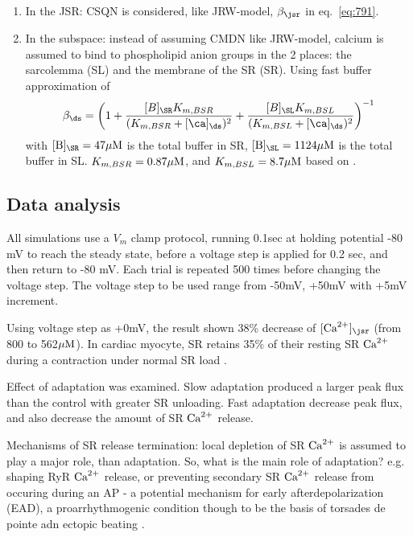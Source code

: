\begin{enumerate}
\item In the JSR: CSQN is considered, like JRW-model, $\beta_\jsr$ in
  eq.~\eqref{eq:791}.

\item In the subspace: instead of assuming CMDN like JRW-model,
  calcium is assumed to bind to phospholipid anion groups in the 2 places: the
  sarcolemma (SL) and the membrane of the SR (SR). Using fast buffer approximation of \citep{wagner1994erb}
  \begin{equation}
    \label{eq:1266}
    \beta_\ds = \left( 1 +
      \frac{[B]_\SR K_{m,BSR}}{(K_{m,BSR}+[\ca]_\ds)^2} 
      + \frac{[B]_\SL K_{m,BSL}}{(K_{m,BSL}+[\ca]_\ds)^2}\right)^{-1}
  \end{equation}
with $[\B]_\SR=47\muM$ is the total buffer in SR, $[\B]_\SL=1124\muM$
is the total buffer in SL. $K_{m,BSR}=0.87{\mu\text{M}}$, and
$K_{m,BSL}=8.7{\mu\text{M}}$ based on \citep{smith1998}. 
\end{enumerate}

\subsection{Data analysis}

All simulations use a $V_m$ clamp protocol, running 0.1sec at holding potential
-80 mV to reach the steady state, before a voltage step is applied for 0.2 sec,
and then return to -80 mV. Each trial is repeated 500 times before changing the
voltage step. The voltage step to be used range from -50mV, +50mV with +5mV
increment. 

Using voltage step as +0mV, the result shown 38\% decrease of $[\Ca]_\jsr$
(from 800 to 562${\mu\text{M}}$). In cardiac myocyte, SR retains 35\% of their resting
SR ${\text{Ca}^{2+}}$ during a contraction under normal SR load \citep{bassani1995fsr}. 


Effect of adaptation was examined. Slow adaptation produced a larger peak flux
than the control with greater SR unloading. Fast adaptation decrease peak flux,
and also decrease the amount of SR ${\text{Ca}^{2+}}$ release.

Mechanisms of SR release termination: local depletion of SR ${\text{Ca}^{2+}}$ is assumed to
play a major role, than adaptation. So, what is the main role of adaptation?
e.g. shaping RyR ${\text{Ca}^{2+}}$ release, or preventing secondary SR ${\text{Ca}^{2+}}$ release from
occuring during an AP - a potential mechanism for early afterdepolarization
(EAD), a proarrhythmogenic condition though to be the basis of torsades de
pointe adn ectopic beating \citep{volders2000}.

